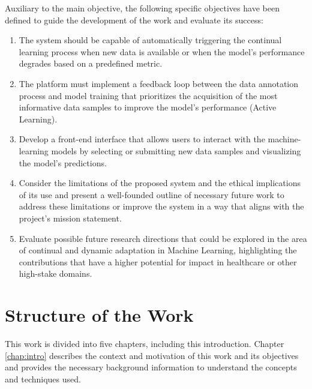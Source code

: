 \documentclass[../main.tex]{subfiles}
\begin{document}
    Auxiliary to the main objective, the following specific objectives have been defined to guide the development of the work and evaluate its success:

    \begin{enumerate}
        \item The system should be capable of automatically triggering the continual learning process when new data is available or when the model's performance degrades based on a predefined metric.
        \item The platform must implement a feedback loop between the data annotation process and model training that prioritizes the acquisition of the most informative data samples to improve the model's performance (Active Learning).
        \item Develop a front-end interface that allows users to interact with the machine-learning models by selecting or submitting new data samples and visualizing the model's predictions.
        \item Consider the limitations of the proposed system and the ethical implications of its use and present a well-founded outline of necessary future work to address these limitations or improve the system in a way that aligns with the project's mission statement.
        \item Evaluate possible future research directions that could be explored in the area of continual and dynamic adaptation in Machine Learning, highlighting the contributions that have a higher potential for impact in healthcare or other high-stake domains.
    \end{enumerate}



    \section{Structure of the Work} \label{sec:structure_of_the_work}

    This work is divided into five chapters, including this introduction. Chapter \ref{chap:intro} describes the context and motivation of this work and its objectives and provides the necessary background information to understand the concepts and techniques used. 
    
\end{document}
